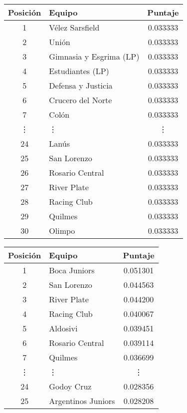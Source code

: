 \begin{table}[H]
    \begin{center}
        \begin{tabular}{| c | l | c |}
            \hline
            Posición & Equipo & Puntaje \\ \hline
            1 & Vélez Sarsfield & 0.033333 \\
            2 & Unión & 0.033333 \\
            3 & Gimnasia y Esgrima (LP) & 0.033333 \\
            4 & Estudiantes (LP) & 0.033333 \\
            5 & Defensa y Justicia & 0.033333 \\
            6 & Crucero del Norte & 0.033333 \\
            7 & Colón & 0.033333 \\
            \vdots & \quad\vdots & \vdots \\
            24 & Lanús & 0.033333 \\
            25 & San Lorenzo & 0.033333 \\
            26 & Rosario Central & 0.033333 \\
            27 & River Plate & 0.033333 \\
            28 & Racing Club & 0.033333 \\
            29 & Quilmes & 0.033333 \\
            30 & Olimpo & 0.033333 \\
            \hline
        \end{tabular}
        \begin{tabular}{| c | l | c |}
            \hline
            Posición & Equipo & Puntaje \\ \hline
            1 & Boca Juniors & 0.051301 \\
            2 & San Lorenzo & 0.044563 \\
            3 & River Plate & 0.044200 \\
            4 & Racing Club & 0.040067 \\
            5 & Aldosivi & 0.039451 \\
            6 & Rosario Central & 0.039114 \\
            7 & Quilmes & 0.036699 \\
            \vdots & \quad\vdots & \vdots \\
            24 & Godoy Cruz & 0.028356 \\
            25 & Argentinos Juniors & 0.028208 \\

\end{tabular}
\end{center}
\end{table}
